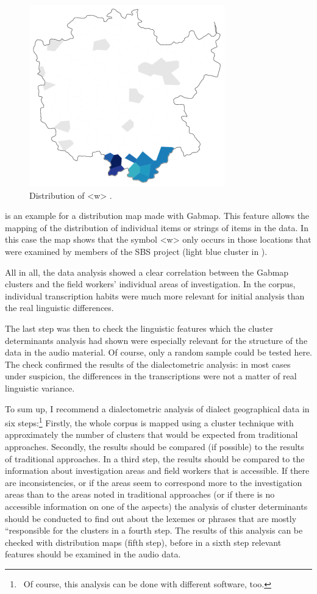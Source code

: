 \documentclass[output=paper]{LSP/langsci}
\begin{document}
\begin{figure}[t]
\includegraphics[width=.5\textwidth]{illustrations/mathus_fig10}
\caption{Distribution of {\textless}w{\textgreater} \citep[226]{mathussek_sprachraume_2014}.}
\label{fig:mathus:10}
\end{figure}
  
 is an example for a distribution map made with Gabmap. This feature allows the mapping of the distribution of individual items or strings of items in the data. In this case the map shows that the symbol {\textless}w{\textgreater} only occurs in those locations that were examined by members of the SBS project (light blue cluster in ).

All in all, the data analysis showed a clear correlation between the Gabmap clusters and the field workers' individual areas of investigation. In the corpus, individual transcription habits were much more relevant for initial analysis than the real linguistic differences.

The last step was then to check the linguistic features which the cluster determinants analysis had shown were especially relevant for the structure of the data in the audio material. Of course, only a random sample could be tested here. The check confirmed the results of the dialectometric analysis: in most cases under suspicion, the differences in the transcriptions were not a matter of real linguistic variance.

To sum up, I recommend a dialectometric analysis of dialect geographical data in six steps:\footnote{\ Of course, this analysis can be done with different software, too.} Firstly, the whole corpus is mapped using a cluster technique with approximately the number of clusters that would be expected from traditional approaches. Secondly, the results should be compared (if possible) to the results of traditional approaches. In a third step, the results should be compared to the information about investigation areas and field workers that is accessible. If there are inconsistencies, or if the areas seem to correspond more to the investigation areas than to the areas noted in traditional approaches (or if there is no accessible information on one of the aspects) the analysis of cluster determinants should be conducted to find out about the lexemes or phrases that are mostly ``responsible{\textquotedbl} for the clusters in a fourth step. The results of this analysis can be checked with distribution maps (fifth step), before in a sixth step relevant features should be examined in the audio data.
\end{document}
